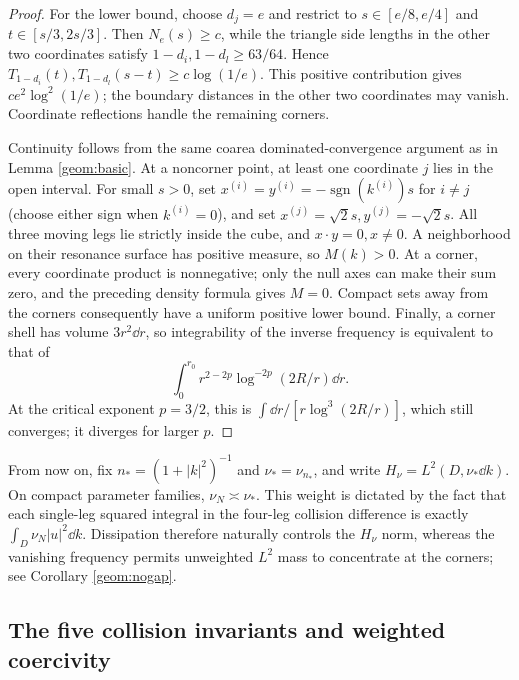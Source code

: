 \begin{proof}
For the lower bound, choose $d_j=e$ and restrict to
$s\in[e/8,e/4]$ and $t\in[s/3,2s/3]$. Then $N_e(s)\ge c$,
while the triangle side lengths in the other two coordinates satisfy
$1-d_i,1-d_l\ge63/64$. Hence
$T_{1-d_i}(t),T_{1-d_l}(s-t)\ge c\log(1/e)$.
This positive contribution gives $ce^2\log^2(1/e)$; the boundary
distances in the other two coordinates may vanish. Coordinate reflections
handle the remaining corners.

Continuity follows from the same coarea dominated-convergence argument
as in Lemma \ref{geom:basic}. At a noncorner point, at least one coordinate
$j$ lies in the open interval. For small $s>0$, set
$x^{(i)}=y^{(i)}=-\operatorname{sgn}(k^{(i)})s$ for $i\ne j$
(choose either sign when $k^{(i)}=0$), and set
$x^{(j)}=\sqrt2s,y^{(j)}=-\sqrt2s$.
All three moving legs lie strictly inside the cube, and
$x\cdot y=0,x\ne0$. A neighborhood on their resonance surface has positive
measure, so $M(k)>0$. At a corner, every coordinate product is nonnegative;
only the null axes can make their sum zero, and the preceding density
formula gives $M=0$. Compact sets away from the corners consequently
have a uniform positive lower bound. Finally, a corner shell has volume
$3r^2\dd r$, so integrability of the inverse frequency is equivalent to that of
\[
 \int_0^{r_0}r^{2-2p}\log^{-2p}(2R/r)\dd r.
\]
At the critical exponent $p=3/2$, this is
$\int\dd r/[r\log^3(2R/r)]$, which still converges; it diverges for
larger $p$.
\end{proof}

From now on, fix $n_*=(1+|k|^2)^{-1}$ and $\nu_* =\nu_{n_*}$, and write
$H_\nu=L^2(D,\nu_*\dd k)$. On compact parameter families,
$\nu_N\asymp\nu_*$. This weight is dictated by the fact that each
single-leg squared integral in the four-leg collision difference is
exactly $\int_D\nu_N|u|^2\dd k$. Dissipation therefore naturally controls
the $H_\nu$ norm, whereas the vanishing frequency permits unweighted
$L^2$ mass to concentrate at the corners; see Corollary \ref{geom:nogap}.

\subsection{The five collision invariants and weighted coercivity}

